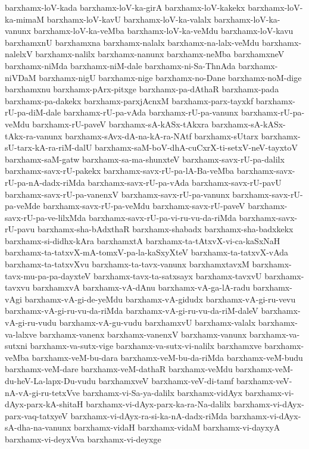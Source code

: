 {barxhamx-loV-kada
barxhamx-loV-ka-girA
barxhamx-loV-kakekx
barxhamx-loV-ka-mimaM
barxhamx-loV-kavU
barxhamx-loV-ka-valalx
barxhamx-loV-ka-vanunx
barxhamx-loV-ka-veMba
barxhamx-loV-ka-veMdu
barxhamx-loV-kavu
barxhamxnU
barxhamxna
barxhamx-nalalx
barxhamx-na-lalx-veMdu
barxhamx-nalelxV
barxhamx-nalilx
barxhamx-nanunx
barxhamx-neMba
barxhamxneV
barxhamx-niMda
barxhamx-niM-dale
barxhamx-ni-Sa-ThnAda
barxhamx-niVDaM
barxhamx-nigU
barxhamx-nige
barxhamx-no-Dane
barxhamx-noM-dige
barxhamxnu
barxhamx-pArx-pitxge
barxhamx-pa-dAthaR
barxhamx-pada
barxhamx-pa-dakekx
barxhamx-parxjAcnxM
barxhamx-parx-tayxkf
barxhamx-rU-pa-diM-dale
barxhamx-rU-pa-vAda
barxhamx-rU-pa-vanunx
barxhamx-rU-pa-veMdu
barxhamx-rU-paveV
barxhamx-sA-kASx-tAkxra
barxhamx-sA-kASx-tAkx-ra-vanunx
barxhamx-sAvx-dA-na-kA-ra-NAtf
barxhamx-sUtarx
barxhamx-sU-tarx-kA-ra-riM-dalU
barxhamx-saM-boV-dhA-cuCxrX-ti-setxV-neV-tayxtoV
barxhamx-saM-gatw
barxhamx-sa-ma-shunxteV
barxhamx-savx-rU-pa-dalilx
barxhamx-savx-rU-pakekx
barxhamx-savx-rU-pa-lA-Ba-veMba
barxhamx-savx-rU-pa-nA-dadx-riMda
barxhamx-savx-rU-pa-vAda
barxhamx-savx-rU-pavU
barxhamx-savx-rU-pa-vanenxV
barxhamx-savx-rU-pa-vanunx
barxhamx-savx-rU-pa-veMde
barxhamx-savx-rU-pa-veMdu
barxhamx-savx-rU-paveV
barxhamx-savx-rU-pa-ve-lilxMda
barxhamx-savx-rU-pa-vi-ru-vu-da-riMda
barxhamx-savx-rU-pavu
barxhamx-sha-bAdxthaR
barxhamx-shabadx
barxhamx-sha-badxkekx
barxhamx-si-didhx-kAra
barxhamxtA
barxhamx-ta-tAtxvX-vi-ca-kaSxNaH
barxhamx-ta-tatxvX-mA-tomxV-pa-la-kaSxyXteV
barxhamx-ta-tatxvX-vAda
barxhamx-ta-tatxvXvu
barxhamx-ta-tavx-vanunx
barxhamxtavxM
barxhamx-tavx-mu-pa-pa-dayxteV
barxhamx-tavx-ta-satxsayx
barxhamx-tavxvU
barxhamx-tavxvu
barxhamxvA
barxhamx-vA-dAnu
barxhamx-vA-ga-lA-radu
barxhamx-vAgi
barxhamx-vA-gi-de-yeMdu
barxhamx-vA-gidudx
barxhamx-vA-gi-ru-vevu
barxhamx-vA-gi-ru-vu-da-riMda
barxhamx-vA-gi-ru-vu-da-riM-daleV
barxhamx-vA-gi-ru-vudu
barxhamx-vA-gu-vudu
barxhamxvU
barxhamx-valalx
barxhamx-va-lalxve
barxhamx-vanenx
barxhamx-vanenxV
barxhamx-vanunx
barxhamx-va-sutxni
barxhamx-va-sutx-vige
barxhamx-va-sutx-vi-nalilx
barxhamxve
barxhamx-veMba
barxhamx-veM-bu-dara
barxhamx-veM-bu-da-riMda
barxhamx-veM-budu
barxhamx-veM-dare
barxhamx-veM-dathaR
barxhamx-veMdu
barxhamx-veM-du-heV-La-lapx-Du-vudu
barxhamxveV
barxhamx-veV-di-tamf
barxhamx-veV-nA-vA-gi-ru-tetxVve
barxhamx-vi-Sa-ya-dalilx
barxhamx-vidAyx
barxhamx-vi-dAyx-parx-kA-shitaH
barxhamx-vi-dAyx-parx-ka-ra-Na-dalilx
barxhamx-vi-dAyx-parx-vaq-tatxyeV
barxhamx-vi-dAyx-ra-si-ka-nA-dadx-riMda
barxhamx-vi-dAyx-sA-dha-na-vanunx
barxhamx-vidaH
barxhamx-vidaM
barxhamx-vi-dayxyA
barxhamx-vi-deyxVva
barxhamx-vi-deyxge
}
